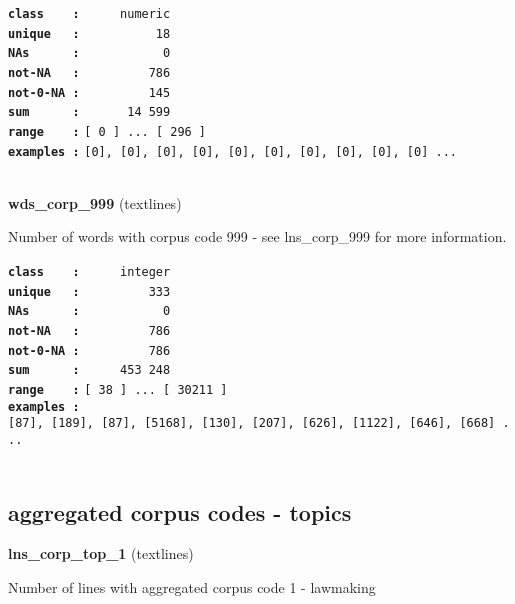 \documentclass[]{article}
\begin{document}
\textbf{\texttt{class\ \ \ \ :}} \texttt{~~~~~numeric}\\
\textbf{\texttt{unique\ \ \ :}} \texttt{~~~~~~~~~~18}\\
\textbf{\texttt{NAs\ \ \ \ \ \ :}} \texttt{~~~~~~~~~~~0}\\
\textbf{\texttt{not-NA\ \ \ :}} \texttt{~~~~~~~~~786}\\
\textbf{\texttt{not-0-NA\ :}} \texttt{~~~~~~~~~145}\\
\textbf{\texttt{sum\ \ \ \ \ \ :}} \texttt{~~~~~~14~599}\\
\textbf{\texttt{range\ \ \ \ :}}
\texttt{{[}\ 0\ {]}\ ...\ {[}\ 296\ {]}}\\
\textbf{\texttt{examples\ :}}
\texttt{{[}0{]},\ {[}0{]},\ {[}0{]},\ {[}0{]},\ {[}0{]},\ {[}0{]},\ {[}0{]},\ {[}0{]},\ {[}0{]},\ {[}0{]}\ ...}\\

~

\textbf{wds\_corp\_999} (textlines)

Number of words with corpus code 999 - see lns\_corp\_999 for more
information.

\textbf{\texttt{class\ \ \ \ :}} \texttt{~~~~~integer}\\
\textbf{\texttt{unique\ \ \ :}} \texttt{~~~~~~~~~333}\\
\textbf{\texttt{NAs\ \ \ \ \ \ :}} \texttt{~~~~~~~~~~~0}\\
\textbf{\texttt{not-NA\ \ \ :}} \texttt{~~~~~~~~~786}\\
\textbf{\texttt{not-0-NA\ :}} \texttt{~~~~~~~~~786}\\
\textbf{\texttt{sum\ \ \ \ \ \ :}} \texttt{~~~~~453~248}\\
\textbf{\texttt{range\ \ \ \ :}}
\texttt{{[}\ 38\ {]}\ ...\ {[}\ 30211\ {]}}\\
\textbf{\texttt{examples\ :}}
\texttt{{[}87{]},\ {[}189{]},\ {[}87{]},\ {[}5168{]},\ {[}130{]},\ {[}207{]},\ {[}626{]},\ {[}1122{]},\ {[}646{]},\ {[}668{]}\ ...}\\

~

\subsection{aggregated corpus codes -
topics}\label{aggregated-corpus-codes---topics}

\textbf{lns\_corp\_top\_1} (textlines)

Number of lines with aggregated corpus code 1 - lawmaking
\end{document}
